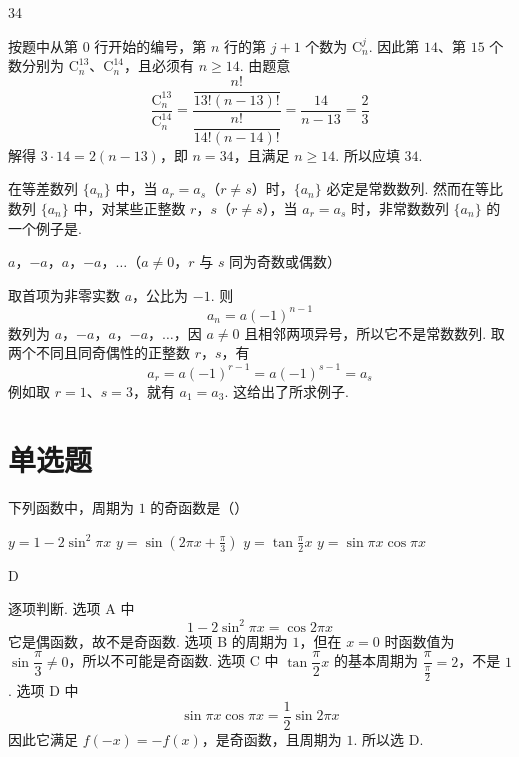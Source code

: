 \begin{answer}
34
\end{answer}

\begin{solution}
按题中从第 \(0\) 行开始的编号，第 \(n\) 行的第 \(j+1\) 个数为 \(\mathrm C_n^j\). 因此第 \(14\)、第 \(15\) 个数分别为 \(\mathrm C_n^{13}\)、\(\mathrm C_n^{14}\)，且必须有 \(n\geqslant14\). 由题意
\[
\frac{\mathrm C_n^{13}}{\mathrm C_n^{14}}
=\frac{\dfrac{n!}{13!(n-13)!}}{\dfrac{n!}{14!(n-14)!}}
=\frac{14}{n-13}=\frac{2}{3}
\]
解得 \(3\cdot14=2(n-13)\)，即 \(n=34\)，且满足 \(n\geqslant14\). 所以应填 \(34\).
\end{solution}

\begin{problem}
在等差数列 \(\{a_{n}\}\) 中，当 \(a_{r}=a_{s}\)（\(r\neq s\)）时，\(\{a_{n}\}\) 必定是常数数列. 然而在等比数列 \(\{a_{n}\}\) 中，对某些正整数 \(r\)，\(s\)（\(r\neq s\)），当 \(a_{r}=a_{s}\) 时，非常数数列 \(\{a_{n}\}\) 的一个例子是\fillinblank{}.
\end{problem}

\begin{answer}
\(a\)，\(-a\)，\(a\)，\(-a\)，\(\ldots\)（\(a\ne0\)，\(r\) 与 \(s\) 同为奇数或偶数）
\end{answer}

\begin{solution}
取首项为非零实数 \(a\)，公比为 \(-1\). 则
\[
a_n=a(-1)^{n-1}
\]
数列为 \(a\)，\(-a\)，\(a\)，\(-a\)，\(\ldots\)，因 \(a\ne0\) 且相邻两项异号，所以它不是常数数列. 取两个不同且同奇偶性的正整数 \(r\)，\(s\)，有
\[
a_r=a(-1)^{r-1}=a(-1)^{s-1}=a_s
\]
例如取 \(r=1\)、\(s=3\)，就有 \(a_1=a_3\). 这给出了所求例子.
\end{solution}

\section{单选题}
\begin{problem}
下列函数中，周期为 \(1\) 的奇函数是（\quad）

\choices
    {\(y = 1 - 2\sin^2\pi x\)}
    {\( y = \sin \left(2\pi x + \frac{\pi}{3}\right) \)}
    {\(y = \tan \frac{\pi}{2} x\)}
    {\( y = \sin \pi x \cos \pi x \)}
\end{problem}

\begin{answer}
D
\end{answer}

\begin{solution}
逐项判断. 选项 A 中
\[
1-2\sin^2\pi x=\cos2\pi x
\]
它是偶函数，故不是奇函数. 选项 B 的周期为 \(1\)，但在 \(x=0\) 时函数值为 \(\sin\dfrac{\pi}{3}\ne0\)，所以不可能是奇函数. 选项 C 中 \(\tan\dfrac{\pi}{2}x\) 的基本周期为 \(\dfrac{\pi}{\frac{\pi}{2}}=2\)，不是 \(1\). 选项 D 中
\[
\sin\pi x\cos\pi x=\frac{1}{2}\sin2\pi x
\]
因此它满足 \(f(-x)=-f(x)\)，是奇函数，且周期为 \(1\). 所以选 D.
\end{solution}

